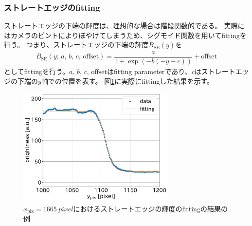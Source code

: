 \documentclass[../../main.tex]{subfiles}
\begin{document}
\subsubsection{ストレートエッジのfitting}
ストレートエッジの下端の輝度は、理想的な場合は階段関数的である。
実際にはカメラのピントによりぼやけてしまうため、シグモイド関数を用いてfittingを行う。
つまり、ストレートエッジの下端の輝度$B_{\mathrm{SE}}(y)$を
\begin{align}
    B_{\mathrm{SE}}(y;\,a,\,b,\,c,\,\text{offset}) = \dfrac{a}{1+\exp(-b(-y-c))} + \mathrm{offset}
\end{align}
としてfittingを行う。$a,\,b,\,c,\,\text{offset}$はfitting parameterであり、$c$はストレートエッジの下端の$y$軸での位置を表す。
図\ref{fig:wiresag_edge_fit}に実際にfittingした結果を示す。
\begin{figure}[H]
    \centering
    \includegraphics[width=0.7\textwidth]{wiresag/wiresag_straight_edge_fit.pdf}
    \caption{$x_{\mathrm{pix}}=\SI{1665}{pixel}$におけるストレートエッジの輝度のfittingの結果の例}
    \label{fig:wiresag_edge_fit}
\end{figure}
\end{document}
